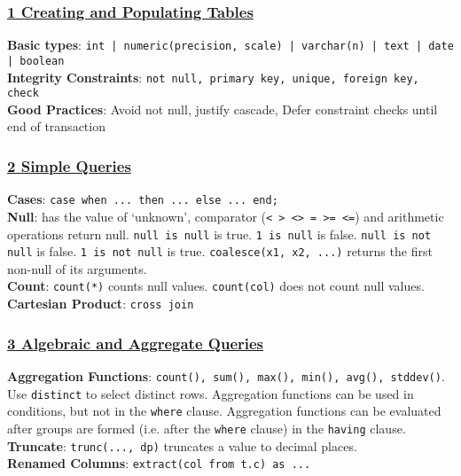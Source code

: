 \documentclass{article}
\begin{document}
\titlespacing*{\subsubsection}{0pt}{1pt}{1pt}

\def\ojoin{\setbox0=\hbox{$\bowtie$}%
  \rule[-.02ex]{.25em}{.4pt}\llap{\rule[\ht0]{.25em}{.4pt}}}
\def\leftouterjoin{\mathbin{\ojoin\mkern-5.8mu\bowtie}}
\def\rightouterjoin{\mathbin{\bowtie\mkern-5.8mu\ojoin}}
\def\fullouterjoin{\mathbin{\ojoin\mkern-5.8mu\bowtie\mkern-5.8mu\ojoin}}

\pagestyle{fancy}
\fancyhf{}
\renewcommand{\headrulewidth}{0pt}

{\small
\begin{multicols*}{3}
\subsubsection*{\underline{1 Creating and Populating Tables}}
\textbf{Basic types}: \texttt{int | numeric(precision, scale) | varchar(n) | text | date | boolean }\\
\textbf{Integrity Constraints}: \texttt{not null, primary key, unique, foreign key, check} \\
\textbf{Good Practices}: Avoid not null, justify cascade, Defer constraint checks until end of transaction
\subsubsection*{\underline{2 Simple Queries}}
\textbf{Cases}: \texttt{case when ... then ... else ... end;}\\
\textbf{Null}: has the value of `unknown', comparator (\texttt{< > <> = >= <=}) and arithmetic operations return null. \texttt{null is null} is true. \texttt{1 is null} is false. \texttt{null is not null} is false. \texttt{1 is not null} is true. \texttt{coalesce(x1, x2, ...)} returns the first non-null of its arguments. \\
\textbf{Count}: \texttt{count(*)} counts null values. \texttt{count(col)} does not count null values. \\
\textbf{Cartesian Product}: \texttt{cross join}
\subsubsection*{\underline{3 Algebraic and Aggregate Queries}}
\textbf{Aggregation Functions}: \texttt{count(), sum(), max(), min(), avg(), stddev()}. Use \texttt{distinct} to select distinct rows. Aggregation functions can be used in conditions, but not in the \texttt{where} clause. Aggregation functions can be evaluated after groups are formed (i.e. after the \texttt{where} clause) in the \texttt{having} clause. \\
\textbf{Truncate}: \texttt{trunc(..., dp)} truncates a value to decimal places.\\
\textbf{Renamed Columns}: \texttt{extract(col from t.c) as ...}

\end{multicols*}}
\end{document}
